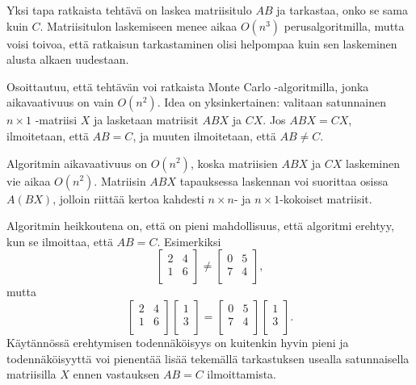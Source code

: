 Yksi tapa ratkaista tehtävä on laskea matriisitulo
$AB$ ja tarkastaa, onko se sama kuin $C$.
Matriisitulon laskemiseen menee aikaa
$O(n^3)$ perusalgoritmilla, mutta voisi toivoa,
että ratkaisun tarkastaminen olisi helpompaa
kuin sen laskeminen alusta alkaen uudestaan.

Osoittautuu, että tehtävän voi ratkaista
Monte Carlo -algoritmilla,
jonka aikavaativuus on vain $O(n^2)$.
Idea on yksinkertainen: valitaan satunnainen
$n \times 1$ -matriisi $X$ ja lasketaan
matriisit $ABX$ ja $CX$.
Jos $ABX=CX$, ilmoitetaan, että $AB=C$,
ja muuten ilmoitetaan, että $AB \neq C$.

Algoritmin aikavaativuus on $O(n^2)$,
koska matriisien $ABX$ ja $CX$ laskeminen
vie aikaa $O(n^2)$.
Matriisin $ABX$ tapauksessa laskennan
voi suorittaa osissa $A(BX)$, jolloin riittää
kertoa kahdesti $n \times n$- ja $n \times 1$-kokoiset
matriisit.

Algoritmin heikkoutena on, että on pieni mahdollisuus,
että algoritmi erehtyy, kun se ilmoittaa, että $AB=C$.
Esimerkiksi 
\[
 \begin{bmatrix}
  2 & 4 \\
  1 & 6 \\
 \end{bmatrix}
\neq
 \begin{bmatrix}
  0 & 5 \\
  7 & 4 \\
 \end{bmatrix},
\]
mutta
\[
 \begin{bmatrix}
  2 & 4 \\
  1 & 6 \\
 \end{bmatrix}
 \begin{bmatrix}
  1 \\
  3 \\
 \end{bmatrix}
=
 \begin{bmatrix}
  0 & 5 \\
  7 & 4 \\
 \end{bmatrix}
 \begin{bmatrix}
  1 \\
  3 \\
 \end{bmatrix}.
\]
Käytännössä erehtymisen todennäköisyys on kuitenkin hyvin
pieni ja todennäköisyyttä voi pienentää lisää
tekemällä tarkastuksen usealla
satunnaisella matriisilla $X$ ennen vastauksen
$AB=C$ ilmoittamista.

